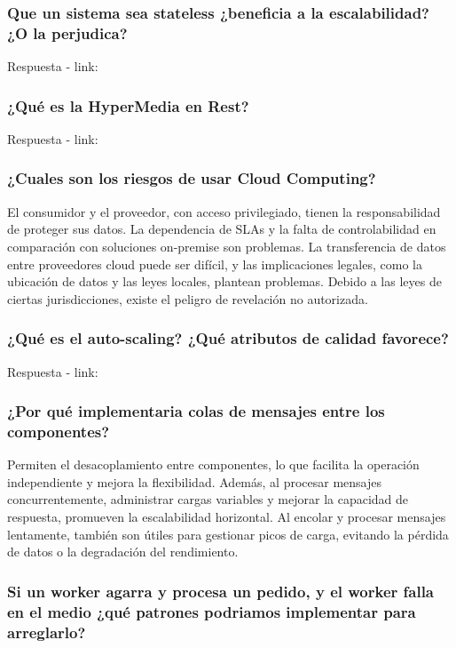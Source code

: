 \documentclass{article}
\begin{document}
  \subsubsection{Que un sistema sea stateless ¿beneficia a la escalabilidad? ¿O la perjudica? }
    Respuesta - link: \textbf{~}

  \subsubsection{¿Qué es la HyperMedia en Rest?}
    Respuesta - link: \textbf{~}
    
  \subsubsection{¿Cuales son los riesgos de usar Cloud Computing?}
  El consumidor y el proveedor, con acceso privilegiado, tienen la responsabilidad de proteger sus datos. La dependencia de SLAs y la falta de controlabilidad en comparación con soluciones on-premise son problemas. La transferencia de datos entre proveedores cloud puede ser difícil, y las implicaciones legales, como la ubicación de datos y las leyes locales, plantean problemas. Debido a las leyes de ciertas jurisdicciones, existe el peligro de revelación no autorizada.

  \subsubsection{¿Qué es el auto-scaling? ¿Qué atributos de calidad favorece?}
    Respuesta - link: \textbf{~}

  \subsubsection{¿Por qué implementaria colas de mensajes entre los componentes?}
  
  Permiten el desacoplamiento entre componentes, lo que facilita la operación independiente y mejora la flexibilidad. Además, al procesar mensajes concurrentemente, administrar cargas variables y mejorar la capacidad de respuesta, promueven la escalabilidad horizontal. Al encolar y procesar mensajes lentamente, también son útiles para gestionar picos de carga, evitando la pérdida de datos o la degradación del rendimiento.

  \subsubsection{Si un worker agarra y procesa un pedido, y el worker falla en el medio ¿qué patrones podriamos implementar para arreglarlo?}
\end{document}

